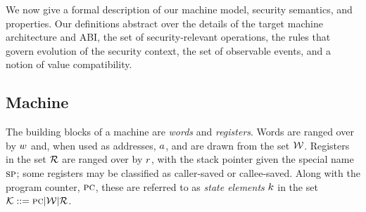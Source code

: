 \documentclass[10pt,conference]{ieeetran}%
\theoremstyle{definition}
\begin{document}

We now give a formal description of our machine model, security semantics,
and properties. Our definitions abstract over the details of the target machine
architecture and ABI, the set of security-relevant operations, the rules that
govern evolution of the security context, the set of observable events, and
a notion of value compatibility.

\subsection{Machine}
The building blocks of a machine are {\em words} and {\em registers}.
Words are ranged over by \(w\) and, when used as addresses, \(a\),
and are drawn from the set \({\mathcal W}\).
Registers in the set \({\mathcal R}\) are ranged over by \(r\), with the stack pointer
given the special name \(\textsc{sp}\);
some registers may be classified as caller-saved or callee-saved.
Along with the program counter, \(\textsc{pc}\), these are referred to as
{\em state elements} \(k\) in the set \({\mathcal K} ::= \textsc{pc} | {\mathcal W} | {\mathcal R}\).
\end{document}
